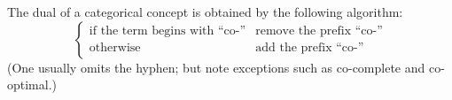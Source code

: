 The dual of a categorical concept is obtained by the following algorithm:
\[
\begin{cases}
\text{if the term begins with ``co-''} & \text{remove the prefix ``co-''} \\
\text{otherwise} & \text{add the prefix ``co-''}
\end{cases}
\]
(One usually omits the hyphen; but note exceptions such as co-complete and co-optimal.)

